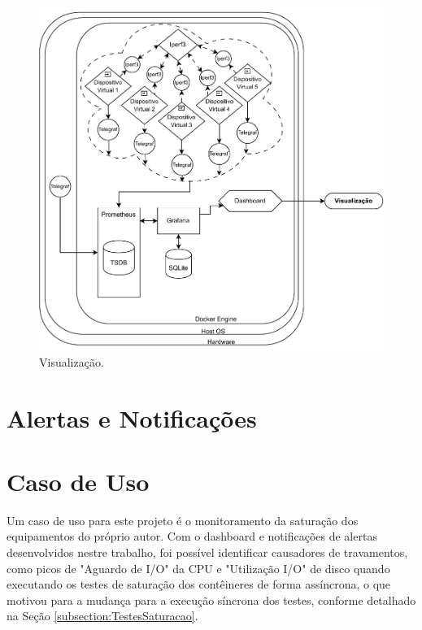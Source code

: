 {\begin{figure}[ht]
\centering
\setlength{\abovecaptionskip}{-20pt}
\includegraphics[width=\textwidth]{Imagens/chap04/by-blocks/dashboard_diagram.pdf}
\caption{Visualização.}
\label{fig:DiagramaVisualizacao}
\end{figure}


}

\section{Alertas e Notificações}
\label{section:Alertas}


{\color{red}
\section{Caso de Uso}
\label{section:CasosDeUso}

Um caso de uso para este projeto é o monitoramento da saturação dos equipamentos do próprio autor. Com o dashboard e notificações de alertas desenvolvidos nestre trabalho, foi possível identificar causadores de travamentos, como picos de "Aguardo de I/O" da CPU e "Utilização I/O" de disco quando executando os testes de saturação dos contêineres de forma assíncrona, o que motivou para a mudança para a execução síncrona dos testes, conforme detalhado na Seção \ref{subsection:TestesSaturacao}. 
}

